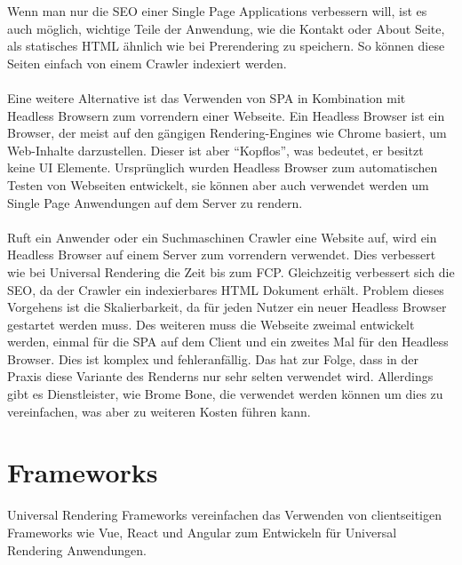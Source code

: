 \documentclass[runningheads]{llncs}
\begin{document}
Wenn man nur die SEO einer Single Page Applications verbessern will, 
ist es auch möglich, 
wichtige Teile der Anwendung, 
wie die Kontakt oder About Seite, 
als statisches HTML ähnlich wie bei Prerendering zu speichern. 
So können diese Seiten einfach von einem Crawler indexiert werden.
\\
\\
Eine weitere Alternative ist das Verwenden von SPA in Kombination mit Headless Browsern zum vorrendern einer Webseite. 
Ein Headless Browser ist ein Browser, 
der meist auf den gängigen Rendering-Engines wie Chrome basiert, 
um Web-Inhalte darzustellen. Dieser ist aber “Kopflos”, was bedeutet, 
er besitzt keine UI Elemente. 
Ursprünglich wurden Headless Browser zum automatischen Testen von Webseiten entwickelt, 
sie können aber auch verwendet werden um Single Page Anwendungen auf dem Server zu rendern. 
\\
\\
Ruft ein Anwender oder ein Suchmaschinen Crawler eine Website auf, 
wird ein Headless Browser auf einem Server zum vorrendern verwendet. 
Dies verbessert wie bei Universal Rendering die Zeit bis zum FCP. Gleichzeitig verbessert sich die SEO, da der Crawler ein indexierbares HTML Dokument erhält. 
Problem dieses Vorgehens ist die Skalierbarkeit, 
da für jeden Nutzer ein neuer Headless Browser gestartet werden muss. 
Des weiteren muss die Webseite zweimal entwickelt werden, 
einmal für die SPA auf dem Client und ein zweites Mal für den Headless Browser. 
Dies ist komplex und fehleranfällig. Das hat zur Folge, 
dass in der Praxis diese Variante des Renderns nur sehr selten verwendet wird. 
Allerdings gibt es Dienstleister, wie Brome Bone, 
die verwendet werden können um dies zu vereinfachen, 
was aber zu weiteren Kosten führen kann.

\newpage

\section{Frameworks}
\label{sec:Evaluation}
Universal Rendering Frameworks vereinfachen das Verwenden von clientseitigen Frameworks wie Vue, 
React und Angular zum Entwickeln für Universal Rendering Anwendungen. 
\end{document}
